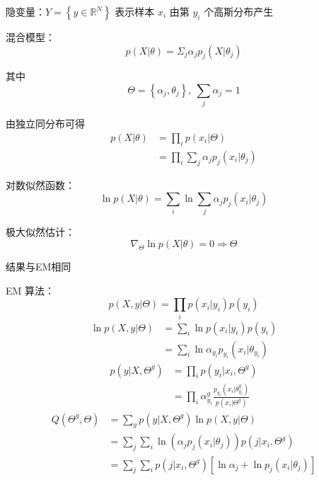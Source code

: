 \documentclass[openany]{ctexbook}
\theoremstyle{kaiti}
\theoremstyle{normal}
\begin{document}
隐变量：$Y=\left\{ y\in \mathbb{R} ^N \right\}$ 表示样本 $x_i$ 由第 $y_i$ 个高斯分布产生

混合模型：
\begin{equation}
p(X|\theta)=\Sigma_j\alpha_jp_j\left(X|\theta_j \right)
\end{equation}

其中
\begin{equation}
\Theta =\left\{ \alpha_j,\theta_j \right\},~\sum_j\alpha_j=1
\end{equation}

由独立同分布可得
\begin{equation}
\begin{aligned}
  p(X|\theta)
  &=\prod_ip\left(x_i|\Theta \right)\\
  &=\prod_i\sum_j\alpha_jp_j\left(x_i|\theta_j \right)
\end{aligned}
\end{equation}

对数似然函数：
\begin{equation}
\ln p(X|\theta)=\sum_i\ln \sum_j\alpha_jp_j\left(x_i|\theta_j \right)
\end{equation}

极大似然估计：
\begin{equation}
\nabla_{\Theta}\ln p(X|\theta)=0\Rightarrow \Theta
\end{equation}

结果与EM相同

EM 算法：
\begin{equation}
p\left(X,y|\Theta \right)=\prod_ip\left(x_i|y_i \right)p\left(y_i \right)
\end{equation}
\begin{equation}
\begin{aligned}
  \ln p\left(X,y|\Theta \right)
  &=\sum_i\ln p\left(x_i|y_i \right)p\left(y_i \right)\\
  &=\sum_i\ln \alpha_{y_i}p_{y_i}\left(x_i|\theta_{y_i} \right)
\end{aligned}
\end{equation}
\begin{equation}
\begin{aligned}
  p\left(y|X,\Theta ^g \right)
  &=\prod_ip\left(y_i|x_i,\Theta ^g \right)\\
  &=\prod_i\alpha_{y_i}^{g}\frac{p_{y_i}\left(x_i|\theta_{y_i}^{g} \right)}{p\left(x_i|\Theta ^g \right)}
\end{aligned}
\end{equation}
\begin{equation}
\begin{aligned}
  Q\left(\Theta ^g,\Theta \right)
  &=\sum_yp\left(y|X,\Theta ^g \right)\ln p\left(X,y|\Theta \right)\\
  &=\sum_j\sum_i\ln \left(\alpha_jp_j\left(x_i|\theta_j \right)\right)p\left(j|x_i,\Theta ^g \right)\\
  &=\sum_j\sum_ip\left(j|x_i,\Theta ^g \right)\left[\ln \alpha_j+\ln p_j\left(x_i|\theta_j \right)\right]
\end{aligned}
\end{equation}
\end{document}

